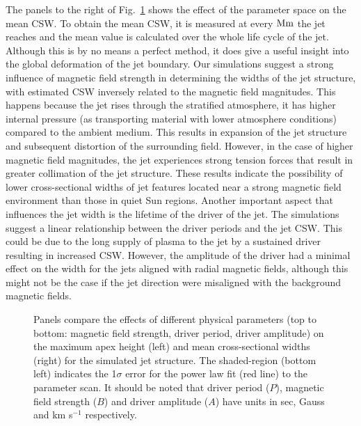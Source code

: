 %
The panels to the right of Fig.~\ref{parameter_scan_lines} shows the effect of the parameter space on the mean CSW. To obtain the mean CSW, it is measured at every $\rm{Mm}$ the jet reaches and the mean value is calculated over the whole life cycle of the jet. Although this is by no means a perfect method, it does give a useful insight into the global deformation of the jet boundary. Our simulations suggest a strong influence of magnetic field strength in determining the widths of the jet structure, with estimated CSW inversely related to the magnetic field magnitudes. This happens because the jet rises through the stratified atmosphere, it has higher internal pressure (as transporting material with lower atmosphere conditions) compared to the ambient medium. This results in expansion of the jet structure and subsequent distortion of the surrounding field. However, in the case of higher magnetic field magnitudes, the jet experiences strong tension forces that result in greater collimation of the jet structure. These results indicate the possibility of lower cross-sectional widths of jet features located near a strong magnetic field environment than those in quiet Sun regions. Another important aspect that influences the jet width is the lifetime of the driver of the jet. The simulations suggest a linear relationship between the driver periods and the jet CSW. This could be due to the long supply of plasma to the jet by a sustained driver resulting in increased CSW. However, the amplitude of the driver had a minimal effect on the width for the jets aligned with radial magnetic fields, although this might not be the case if the jet direction were misaligned with the background magnetic fields.
\begin{figure}
\captionsetup[subfigure]{labelformat=empty}
\centering
{}
\caption{Panels compare the effects of different physical parameters (top to bottom: magnetic field strength, driver period, driver amplitude) on the maximum apex height (left) and mean cross-sectional widths (right) for the simulated jet structure. The shaded-region (bottom left) indicates the 1$\sigma$ error for the power law fit (red line) to the parameter scan. It should be noted that driver period ($P$), magnetic field strength ($B$) and driver amplitude ($A$) have units in sec, Gauss and km s$^{-1}$ respectively.}
\label{parameter_scan_lines}
\end{figure}
